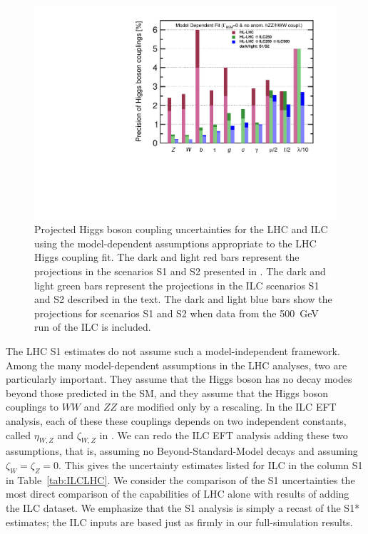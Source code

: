 \begin{figure}
\begin{center}
\includegraphics[width=0.85\hsize]{chapters/figures/ModeldepSummary.pdf}
\caption{Projected Higgs boson coupling uncertainties for the LHC and
  ILC
using the model-dependent assumptions appropriate to the LHC Higgs
coupling fit.   The
dark and light red bars represent the projections in the scenarios S1
and S2 presented in  \cite{YR}.    The dark and light green bars represent the
projections in the ILC scenarios S1 and S2 described in the
text.  The dark and light blue bars show the projections for scenarios S1 and S2
when
data from the 500~GeV run of the ILC is included.}
 \label{fig:ILCLHC}
\end{center}
\end{figure}


The LHC S1 estimates do not assume such a model-independent framework.
Among the many model-dependent assumptions in the LHC  analyses, two are
particularly important. They  assume  that the Higgs boson has no decay
modes beyond those predicted in the SM, and they  assume that the Higgs
boson couplings to $WW$ and $ZZ$ are modified only by a rescaling.  In
the ILC EFT analysis, each of these these couplings depends on two
independent constants, called $\eta_{W,Z}$ and $\zeta_{W,Z}$ in
\cite{Barklow:2017suo}.   We can redo the ILC EFT analysis
adding these two assumptions, that is, assuming no
Beyond-Standard-Model decays and assuming $\zeta_{W} = \zeta_Z = 0$.
This gives the uncertainty estimates listed for ILC  in the column S1
in Table~\ref{tab:ILCLHC}.   We consider the comparison of the S1
uncertainties the most direct comparison of the capabilities of  LHC
alone with results of adding the ILC dataset. 
  We emphasize that the S1 analysis is 
simply a recast of the S1* estimates; the ILC inputs are based just 
as firmly in our full-simulation results.

